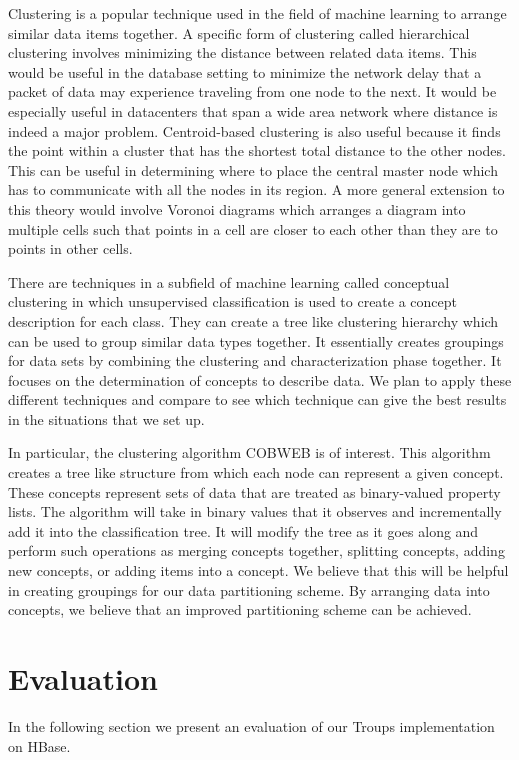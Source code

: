 \documentclass[10pt,final,journal]{IEEEtran}
\begin{document}
Clustering is a popular technique used in the field of machine learning to arrange similar data items together.  A specific form of clustering called hierarchical clustering involves minimizing the distance between related data items.  This would be useful in the database setting to minimize the network delay that a packet of data may experience traveling from one node to the next.  It would be especially useful in datacenters that span a wide area network where distance is indeed a major problem.  Centroid-based clustering is also useful because it finds the point within a cluster that has the shortest total distance to the other nodes.  This can be useful in determining where to place the central master node which has to communicate with all the nodes in its region.  A more general extension to this theory would involve Voronoi diagrams which arranges a diagram into multiple cells such that points in a cell are closer to each other than they are to points in other cells.

There are techniques in a subfield of machine learning called conceptual clustering in which unsupervised classification is used to create a concept description for each class. They can create a tree like clustering hierarchy which can be used to group similar data types together. It essentially creates groupings for data sets by combining the clustering and characterization phase together. It focuses on the determination of concepts to describe data. We plan to apply these different techniques and compare to see which technique can give the best results in the situations that we set up.

In particular, the clustering algorithm COBWEB is of interest. This algorithm creates a tree like structure from which each node can represent a given concept. These concepts represent sets of data that are treated as binary-valued property lists. The algorithm will take in binary values that it observes and incrementally add it into the classification tree. It will modify the tree as it goes along and perform such operations as merging concepts together, splitting concepts, adding new concepts, or adding items into a concept. We believe that this will be helpful in creating groupings for our data partitioning scheme. By arranging data into concepts, we believe that an improved partitioning scheme can be achieved.

\section{Evaluation}
In the following section we present an evaluation of our Troups implementation on HBase.
\end{document}
